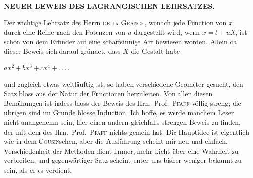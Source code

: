 \clearpage
{}
\begin{center}
\textbf{NEUER BEWEIS DES LAGRANGISCHEN LEHRSATZES.}
\end{center}

\noindent\hspace*{\parindent}Der wichtige Lehrsatz des Herrn \textsc{de la Grange}, wonach jede Function von
$x$ durch eine Reihe nach den Potenzen von $u$ dargestellt wird, wenn $x=t+uX$,
ist schon von dem Erfinder auf eine scharfsinnige Art bewiesen worden.
Allein da dieser Beweis sich darauf gründet, dass $X$ die Gestalt habe
\begin{center}
$\displaystyle ax^2+bx^3+cx^4+.\,.\,.\,.$
\end{center}
\noindent und zugleich etwas weitläuftig ist, so haben verschiedene Geometer gesucht,
den Satz bloss aus der Natur der Functionen herzuleiten.
Von allen diesen Bemühungen ist indess bloss der Beweis des Hrn.\ Prof.\ \textsc{Pfaff}
völlig streng; die übrigen sind im Grunde blosse Induction. Ich hoffe, es werde
manchem Leser nicht unangenehm sein, hier einen andern gleichfalls strengen
Beweis zu finden, der mit dem des Hrn.\ Prof.\ \textsc{Pfaff} nichts gemein hat. Die
Hauptidee ist eigentlich wie in dem \textsc{Cousin}schen, aber die Ausführung scheint
mir neu und einfach. Verschiedenheit der Methoden dient immer, mehr Licht über
eine Wahrheit zu verbreiten, und gegenwärtiger Satz scheint unter uns bisher
weniger bekannt zu sein, als er es verdient.

